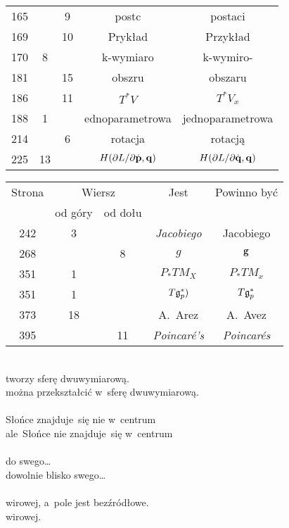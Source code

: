 \documentclass[a4paper,11pt]{article}
\numberwithin{equation}{section}
\begin{document}
\begin{center}
\begin{tabular}{|c|c|c|c|c|}
    165 & &  9 & postc & postaci \\
    169 & & 10 & Prykład & Przykład \\
    170 & 8 & & k-wymiaro & k-wymiro- \\
    181 & & 15 & obszru & obszaru \\
    186 & & 11 & $T^{ * } V$ & $T^{ * } V_{ x }$ \\
    188 & 1 & & ednoparametrowa & jednoparametrowa \\
    214 & & 6 & rotacja & rotacją \\
    225 & 13 & & $H( \partial L / \partial \dot{ \mathbf{p} }, \mathbf{q} )$
           & $H( \partial L / \partial \dot{ \mathbf{q} }, \mathbf{q} )$ \\
    \hline
  \end{tabular}





  \newpage

  \begin{tabular}{|c|c|c|c|c|}
    \hline
    Strona & \multicolumn{2}{c|}{Wiersz} & Jest
                              & Powinno być \\ \cline{2-3}
    & od góry & od dołu & & \\
    \hline
    242 &  3 & & \textit{Jacobiego} & Jacobiego \\
    268 & &  8 & $g$ & $\mathbf{g}$ \\
    351 &  1 & & $P_{ * }TM_{ X }$ & $P_{ * }TM_{ x }$ \\
    351 &  1 & & $T\mathfrak{g}_{ p }^{ * })$ & $T\mathfrak{g}_{ p }^{ * }$ \\
    373 & 18 & & A.~Arez & A.~Avez \\
    395 & & 11 & \textit{Poincar\'{e}'s} & \textit{Poincar\'{e}s} \\
    \hline
  \end{tabular}

\end{center}

\VerSpaceTwo



\noindent
{} \\
\Jest  tworzy sferę dwuwymiarową. \\
\Powin można przekształcić w~sferę dwuwymiarową. \\
 \\
\Jest  Słońce znajduje~się nie w~centrum \\
\Powin ale~Słońce nie znajduje~się w~centrum \\
 \\
\Jest  do swego\ldots \\
\Powin dowolnie blisko swego\ldots \\
 \\
\Jest  wirowej, a~pole jest bezźródłowe. \\
\Powin wirowej. \\
\end{document}
